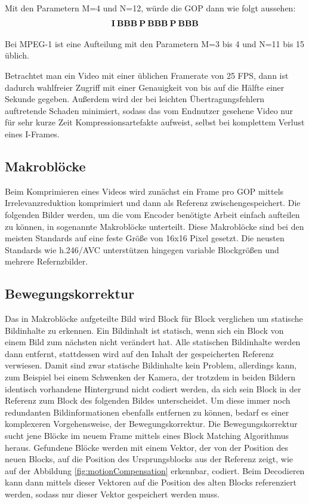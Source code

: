 Mit den Parametern M=4 und N=12, würde die GOP dann wie folgt aussehen:
\begin{align*}
\bold{I\:BBB\:P\:BBB\:P\:BBB}
\end{align*}

Bei MPEG-1 ist eine Aufteilung mit den Parametern M=3 bis 4 und N=11 bis 15 üblich. \cite{symes_peter_digital_2004}

Betrachtet man ein Video mit einer üblichen Framerate von 25 FPS, dann ist dadurch wahlfreier Zugriff mit einer Genauigkeit von bis auf die Hälfte einer Sekunde gegeben. Außerdem wird der bei leichten Übertragungsfehlern auftretende Schaden minimiert, sodass das vom Endnutzer gesehene Video nur für sehr kurze Zeit Kompressionsartefakte aufweist, selbst bei komplettem Verlust eines I-Frames. 
\subsection{Makroblöcke}
Beim Komprimieren eines Videos wird zunächst ein Frame pro GOP mittels Irrelevanzreduktion komprimiert und dann als Referenz zwischengespeichert. Die folgenden Bilder werden, um die vom Encoder benötigte Arbeit einfach aufteilen zu können, in sogenannte Makroblöcke unterteilt. Diese Makroblöcke sind bei den meisten Standards auf eine feste Größe von 16x16 Pixel gesetzt.\cite{symes_peter_digital_2004} Die neusten Standards wie h.246/AVC unterstützen hingegen variable Blockgrößen und mehrere Refernzbilder. \cite{lin2009vlsi}
\subsection{Bewegungskorrektur}
Das in Makroblöcke aufgeteilte Bild wird Block für Block verglichen um statische Bildinhalte zu erkennen. \cite{symes_peter_digital_2004} Ein Bildinhalt ist statisch, wenn sich ein Block von einem Bild zum nächsten nicht verändert hat. Alle statischen Bildinhalte werden dann entfernt, stattdessen wird auf den Inhalt der gespeicherten Referenz verwiesen. 
Damit sind zwar statische Bildinhalte kein Problem, allerdings kann, zum Beispiel bei einem Schwenken der Kamera, der trotzdem in beiden Bildern identisch vorhandene Hintergrund nicht codiert werden, da sich sein Block in der Referenz zum Block des folgenden Bildes unterscheidet. Um diese immer noch redundanten Bildinformationen ebenfalls entfernen zu können, bedarf es einer komplexeren Vorgehensweise, der Bewegungskorrektur.
Die Bewegungskorrektur sucht jene Blöcke im neuem Frame mittels eines Block Matching Algorithmus heraus. Gefundene Blöcke werden mit einem Vektor, der von der Position des neuen Blocks, auf die Position des Ursprungsblocks aus der Referenz zeigt, wie auf der Abbildung \ref{fig:motionCompensation} erkennbar, codiert.\cite{symes_peter_digital_2004} Beim Decodieren kann dann mittels dieser Vektoren auf die Position des alten Blocks referenziert werden, sodass nur dieser Vektor gespeichert werden muss.
